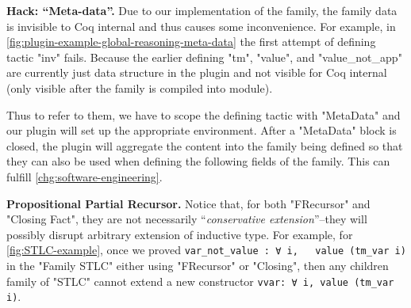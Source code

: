 \textbf{Hack: ``Meta-data''.} Due to our implementation of the family,
the family data is invisible to Coq internal and thus causes some
inconvenience. For example, in
\cref{fig:plugin-example-global-reasoning-meta-data} the first attempt
of defining tactic "inv" fails. Because the earlier defining "tm",
"value", and "value_not_app" are currently just data structure in the
plugin and not visible for Coq internal (only visible after the family
is compiled into module). 

Thus to refer to them, we have to scope the defining tactic with
"MetaData" and our plugin will set up the appropriate environment. After
a "MetaData" block is closed, the plugin will aggregate the content into
the family being defined so that they can also be used when defining
the following fields of the family.
This can fulfill \ref{chg:software-engineering}.








\textbf{Propositional Partial Recursor.} Notice that, for both "FRecursor" and "Closing Fact", they are not necessarily ``\textit{conservative extension}''--they will possibly disrupt arbitrary extension of inductive type. For example, for \cref{fig:STLC-example}, once we proved \texttt{var_not_value : ∀ i, ~ value (tm_var i)} in the "Family STLC" either using "FRecursor" or "Closing", then any children family of "STLC" cannot extend a new constructor \texttt{vvar: ∀ i, value (tm_var i)}. 

